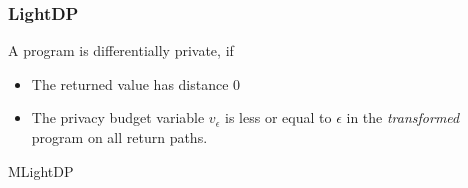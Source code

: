 \documentclass[english, aspectratio=169]{beamer}
\begin{document}
\begin{frame}
  \frametitle{LightDP}

  A program is differentially private, if

  \pause

  \begin{itemize}
  \item The returned value has distance $0$
  \end{itemize}
  
  \begin{prooftree}
  \end{prooftree}
  
  \vspace{1em}\pause

  \begin{itemize}
  \item The privacy budget variable $v_\epsilon$ is less or equal to $\epsilon$
    in the \emph{transformed} program on all return paths.
  \end{itemize}
  
  \begin{prooftree}
  \end{prooftree}


\end{frame}

\begin{frame}{}
  \pause
  \begin{center}
    \huge MLightDP
  \end{center}
\end{frame}
\end{document}
